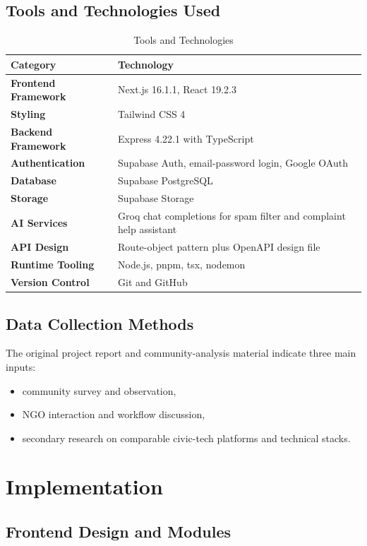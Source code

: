 \documentclass[12pt,a4paper]{report}
\begin{document}
\section{Tools and Technologies Used}
\begin{table}[H]
\centering
\caption{Tools and Technologies}
\begin{tabularx}{\textwidth}{>{\bfseries}lX}
\toprule
Category & Technology \\
\midrule
Frontend Framework & Next.js 16.1.1, React 19.2.3 \\
Styling & Tailwind CSS 4 \\
Backend Framework & Express 4.22.1 with TypeScript \\
Authentication & Supabase Auth, email-password login, Google OAuth \\
Database & Supabase PostgreSQL \\
Storage & Supabase Storage \\
AI Services & Groq chat completions for spam filter and complaint help assistant \\
API Design & Route-object pattern plus OpenAPI design file \\
Runtime Tooling & Node.js, pnpm, tsx, nodemon \\
Version Control & Git and GitHub \\
\bottomrule
\end{tabularx}
\end{table}

\section{Data Collection Methods}
The original project report and community-analysis material indicate three main inputs:
\begin{itemize}
  \item community survey and observation,
  \item NGO interaction and workflow discussion,
  \item secondary research on comparable civic-tech platforms and technical stacks.
\end{itemize}

\chapter{Implementation}
\section{Frontend Design and Modules}
\end{document}
